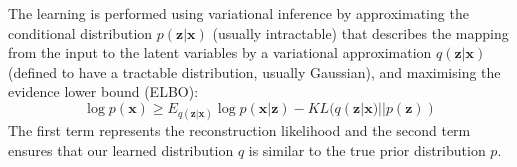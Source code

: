 \documentclass[portrait,final,a0paper,fontscale=0.32]{baposter}
\begin{document}
\begin{poster}
{\begin{center}
\begin{minipage}{0.95\textwidth}
\vspace{1mm}
The learning is performed using variational inference by approximating the conditional distribution $p(\mathbf{z}|\mathbf{x})$ (usually intractable) that describes the mapping from the input to the latent variables by a variational approximation $q(\mathbf{z}|\mathbf{x})$ (defined to have a tractable distribution, usually Gaussian), and maximising the evidence lower bound (ELBO):
$$
\log p(\mathbf{x}) \ge E_{q(\mathbf{z}|\mathbf{x})}\log p(\mathbf{x}|\mathbf{z}) - KL(q(\mathbf{z}|\mathbf{x})||p(\mathbf{z}))
$$
The first term represents the reconstruction likelihood and the second term ensures that our learned distribution $q$ is similar to the true prior distribution $p$.
\vspace{2mm}
\end{minipage}
\end{center}

 }

 


\end{poster}
\end{document}
